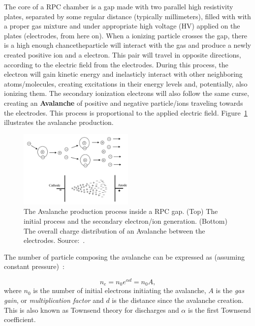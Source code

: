 The core of a RPC chamber is a gap made with two parallel high resistivity plates, separated by some regular distance (typically millimeters), filled with with a proper gas mixture and under appropriate high voltage (HV) applied on the plates (electrodes, from here on). When a ionizing particle crosses the gap, there is a high enough chancetheparticle will interact with the gas and produce a newly created positive ion and a electron. This pair will travel in opposite directions, according to the electric field from the electrodes. During this process, the electron will gain kinetic energy and inelasticly interact with other neighboring atoms/molecules, creating excitations in their energy levels and, potentially, also ionizing them. The secondary ionization electrons will also follow the same curse, creating an \textbf{Avalanche} of positive and negative particle/ions traveling towards the electrodes. This process is proportional to the applied electric field. Figure~\ref{avalanche} illustrates the avalanche production.


\begin{figure}[h]
    \begin{center}
    \includegraphics[width=0.5\textwidth,keepaspectratio]{figures_and_tables/rpc/avalanche_prod.png}
    \end{center}
    \caption{The Avalanche production process inside a RPC gap. (Top) The initial process and the secondary electron/ion generation. (Bottom) The overall charge distribution of an Avalanche between the electrodes. Source:~\cite{livro_descarga}.}
    \label{avalanche}
\end{figure}

The number of particle composing the avalanche can be expressed as (assuming constant pressure)~\cite{livro_descarga}:

\begin{equation}
    n_{e}=n_{0}e^{\alpha d} = n_{0}A,
\end{equation}
where $n_{0}$ is the number of initial electrons initiating the avalanche, $A$ is the \textit{gas gain}, or \textit{multiplication factor} and $d$ is the distance since the avalanche creation. This is also known as Townsend theory for discharges and $\alpha$ is the first Townsend coefficient.

